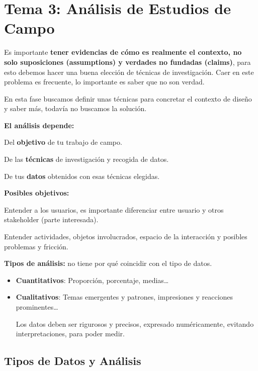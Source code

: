 \documentclass[12pt]{report} %
\begin{document}
\chapter{Tema 3: Análisis de Estudios de
Campo}

Es importante \textbf{tener evidencias de cómo es realmente el contexto,
no solo suposiciones (assumptions) y verdades no fundadas (claims)},
para esto debemos hacer una buena elección de técnicas de investigación.
Caer en este problema es frecuente, lo importante es saber que no son
verdad.

En esta fase buscamos definir unas técnicas para concretar el contexto
de diseño y saber más, todavía no buscamos la solución.

\textbf{El análisis depende:}

Del \textbf{objetivo} de tu trabajo de campo.

De las \textbf{técnicas} de investigación y recogida de datos.

De tus \textbf{datos} obtenidos con esas técnicas elegidas.

\textbf{Posibles objetivos:}

Entender a los usuarios, es importante diferenciar entre usuario y otros
stakeholder (parte interesada).

Entender actividades, objetos involucrados, espacio de la interacción y
posibles problemas y fricción.

\textbf{Tipos de análisis:} no tiene por qué coincidir con el tipo de
datos.

\begin{itemize}
\item
  \textbf{Cuantitativos}: Proporción, porcentaje, medias\ldots{}
\item
  \textbf{Cualitativos}: Temas emergentes y patrones, impresiones y
  reacciones prominentes\ldots{}

  Los datos deben ser rigurosos y precisos, expresado numéricamente,
  evitando interpretaciones, para poder medir.
\end{itemize}

\section{Tipos de Datos y
Análisis}
\end{document}

